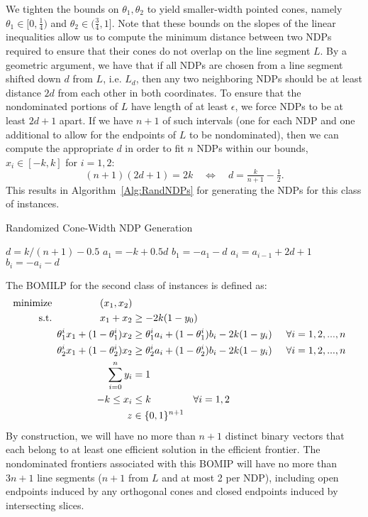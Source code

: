 \documentclass[11pt]{article} %
\begin{document}
We tighten the bounds on $\theta_1, \theta_2$ to yield smaller-width pointed cones, namely $\theta_1\in[0,\frac{1}{4})$ and $\theta_2\in(\frac{3}{4},1]$. 
Note that these bounds on the slopes of the linear inequalities allow us to compute the minimum distance between two NDPs required to ensure that their cones do not overlap on the line segment $L$. By a geometric argument, we have that if all NDPs are chosen from a line segment shifted down $d$ from $L$, i.e. $L_d$, then any two neighboring NDPs should be at least distance $2d$ from each other in both coordinates. To ensure that the nondominated portions of $L$ have length of at least $\epsilon$, we force NDPs to be at least $2d+1$ apart. If we have $n+1$ of such intervals (one for each NDP and one additional to allow for the endpoints of $L$ to be nondominated), then we can compute the appropriate $d$ in order to fit $n$ NDPs within our bounds, $x_i\in [-k,k]$ for $i=1,2$:
$$ (n+1)(2d+1) = 2k \quad \Leftrightarrow \quad  d = \tfrac{k}{n+1} - \tfrac{1}{2}. $$
This results in Algorithm~\ref{Alg:RandNDPs} for generating the NDPs for this class of instances.

\begin{algorithm}[H]
	\caption{Randomized Cone-Width NDP Generation}\label{Alg:RandNDPs}
	\small
	\begin{algorithmic}[1]
		\STATE $d=k/(n+1)-0.5$
		\STATE $a_1 = -k + 0.5 d$
		\STATE $b_1 = -a_1-d$
		\STATE $a_i = a_{i-1}+2d+1$ 
		\STATE $b_i = -a_i-d$
		\ENDFOR
	\end{algorithmic}
\end{algorithm}

The BOMILP for the second class of instances is defined as:
\begin{align}
\text{minimize}\hspace{1.7cm} (x_1,x_2) \nonumber \\
\text{s.t.}\hspace{1.7cm} x_1+x_2 &\geq -2k(1-y_0) \label{Eq:LineConstraint}\\ 
\theta^i_1 x_1 + (1-\theta^i_1)x_2 &\geq \theta^i_1 a_i + (1-\theta^i_1)b_i -2k(1-y_i) \hspace{0.5cm} \forall i=1,2,...,n \label{Eq:ThetaConstraint1} \\ 
\theta^i_2 x_1 + (1-\theta^i_2)x_2 &\geq \theta^i_2 a_i + (1-\theta^i_2)b_i -2k(1-y_i) \hspace{0.5cm} \forall i=1,2,...,n \label{Eq:ThetaConstraint2} \\
\sum_{i=0}^n y_i &=1 \\
-k \leq x_i &\leq k \hspace{1.5cm} \forall i=1,2 \\
z&\in\{0,1\}^{n+1} \nonumber
\end{align}
By construction, we will have no more than $n+1$ distinct binary vectors that each belong to at least one efficient solution in the efficient frontier. The nondominated frontiers associated with this BOMIP will have no more than $3n+1$ line segments ($n+1$ from $L$ and at most 2 per NDP), including open endpoints induced by any orthogonal cones and closed endpoints induced by intersecting slices. 
\end{document}
